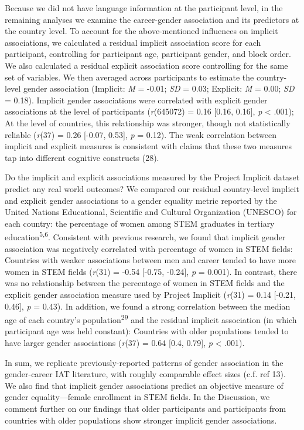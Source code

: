 \documentclass[9pt,twocolumn]{pnas-new}
\begin{document}
Because we did not have language information at the participant level, in the remaining analyses we examine the career-gender association and its predictors at the country level. To account for the above-mentioned influences on implicit associations, we calculated a residual implicit association score for each participant, controlling for participant age, participant gender, and block order. We also calculated a residual explicit association score controlling for the same set of variables. We then averaged across participants to estimate the country-level gender association (Implicit: \emph{M} = -0.01; \emph{SD} = 0.03; Explicit: \emph{M} = 0.00; \emph{SD} = 0.18). Implicit gender associations were correlated with explicit gender associations at the level of participants (\emph{r}(645072) = 0.16 {[}0.16, 0.16{]}, \emph{p} \textless{} .001); At the level of countries, this relationship was stronger, though not statistically reliable (\emph{r}(37) = 0.26 {[}-0.07, 0.53{]}, \emph{p} = 0.12). The weak correlation between implicit and explicit measures is consistent with claims that these two measures tap into different cognitive constructs (28).

Do the implicit and explicit associations measured by the Project Implicit
dataset predict any real world outcomes? We compared our residual
country-level implicit and explicit gender associations to a gender equality
metric reported by the United Nations Educational, Scientific and
Cultural Organization (UNESCO) for each country: the percentage of women
among STEM graduates in tertiary education\textsuperscript{5,6}.  Consistent with previous research, we found that implicit gender association was negatively
correlated with percentage of women in STEM fields: Countries with
weaker associations between men and career tended to have more women in STEM fields (\emph{r}(31) = -0.54 {[}-0.75, -0.24{]}, \emph{p} = 0.001). In contrast, there was no
relationship between the percentage of women in STEM fields and the
explicit gender association measure used by Project Implicit (\emph{r}(31) = 0.14 {[}-0.21, 0.46{]}, \emph{p} = 0.43). In addition, we found a strong correlation between the
median age of each country's population\textsuperscript{29} and the residual implicit association (in which participant age
was held constant): Countries with older populations tended to have
larger gender associations (\emph{r}(37) = 0.64 {[}0.4, 0.79{]}, \emph{p} \textless{} .001).


In sum, we replicate previously-reported patterns of gender association in the
gender-career IAT literature, with roughly comparable effect sizes (c.f. ref 13). We also find that implicit gender associations predict an objective measure of gender equality---female enrollment in STEM fields. In the Discussion, we comment further on our findings that older participants and participants from countries with older populations show stronger implicit gender associations.
\end{document}
